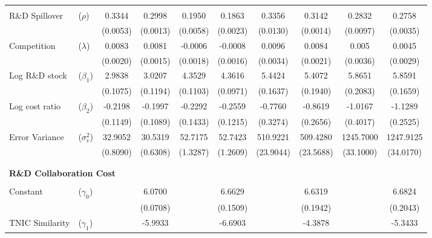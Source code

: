 \documentclass[12pt]{article}
\begin{document}
\begin{spacing}{2}
\begin{table}[tbp]
\begin{center}
\begin{adjustbox}{max width=\textwidth,max totalheight=\textheight,keepaspectratio}
\begin{threeparttable}
\begin{tabular}{llcccccccc}
    \vspace{-0.25cm}\\
 R\&D Spillover  & ($\rho$)      & 0.3344   & 0.2998    & 0.1950   & 0.1863   & 0.3356   & 0.3142    & 0.2832    & 0.2758   \\
                    &               & (0.0053) & (0.0013)  & (0.0058) & (0.0023) & (0.0130) & (0.0014)  & (0.0097)  & (0.0035) \\
    Competition     & ($\lambda$)   & 0.0083   & 0.0081    & -0.0006  & -0.0008  & 0.0096   & 0.0084    & 0.005     & 0.0045   \\ 
                    &               & (0.0020) & (0.0015)  & (0.0018) & (0.0016) & (0.0034) & (0.0021)  & (0.0036)  & (0.0029) \\
    Log R\&D stock  & ($\beta_1$)   & 2.9838   & 3.0207    & 4.3529   & 4.3616   & 5.4424   & 5.4072    & 5.8651    & 5.8591   \\
                    &               & (0.1075) & (0.1194)  & (0.1103) & (0.0971) & (0.1637) & (0.1940)  & (0.2083)  & (0.1659) \\
    Log cost ratio  & ($\beta_2$)   & -0.2198  & -0.1997   & -0.2292  & -0.2559  & -0.7760  & -0.8619   & -1.0167   & -1.1289  \\
                    &               & (0.1149) & (0.1089)  & (0.1433) & (0.1215) & (0.3274) & (0.2656)  & (0.4017)  & (0.2525) \\
    Error Variance & ($\sigma_v^2$) & 32.9052  & 30.5319   & 52.7175  & 52.7423  & 510.9221 & 509.4280  & 1245.7000 & 1247.9125 \\
                    &               & (0.8090) & (0.6308)  & (1.3287) & (1.2609) & (23.9044)& (23.5688) & (33.1000) & (34.0170) \\
        \vspace{-0.25cm}\\
\hdashline[0.4pt/2pt]
\vspace{-0.25cm}\\
    \multicolumn{6}{l}{\bf R\&D Collaboration Cost} \\
    \vspace{-0.25cm}\\
Constant                 & ($\gamma_0$)  &  &        6.0700            &  & 6.6629   &  &          6.6319   &  &        6.6824   \\
                             &               &  &       (0.0708) &  &           (0.1509) &  &          (0.1942) &  &        (0.2043) \\
    TNIC Similarity          & ($\gamma_1$)  &  &        -5.9933  &  &           -6.6903  &  &          -4.3878  &  &        -5.3433  \\

\end{tabular}
\end{threeparttable}
\end{adjustbox}
\end{center}
\end{table}
\end{spacing}
\end{document}
